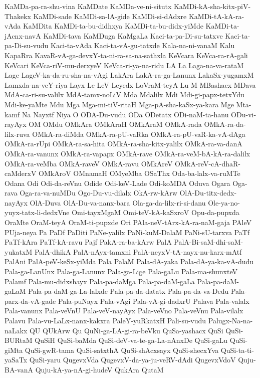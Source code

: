 {KaMDa-pa-ra-shu-vina
KaMDate
KaMDa-ve-ni-situtx
KaMDi-kA-sha-kitx-piV-Thakekx
KaMDi-sade
KaMDi-sa-lA-gide
KaMDi-si-dAdxre
KaMDi-tA-kA-ra-vAda
KaMDita
KaMDi-ta-bu-didhxya
KaMDi-ta-bu-didx-yiMde
KaMDi-ta-jAcnx-navA
KaMDi-tava
KaMDuga
KaMgaLa
Kaci-ta-pa-Di-su-tatxve
Kaci-ta-pa-Di-su-vudu
Kaci-ta-vAda
Kaci-ta-vA-gu-tatxde
Kala-na-ni-vanaM
Kalu
KapaRra
KavaR-vA-ga-devxY-ta-ni-ra-sa-na-sathxla
KeVcara
KeVca-ra-rA-gali
KeVcari
KeVca-riV-mu-derxyeV
KeVca-ri-ya-na-ridu
LA
La
Laga-na-va-rataM
Lage
LageV-ka-da-ru-sha-na-vAgi
LakAra
LakA-ra-ga-Lanunx
LakaSx-yugamxM
Lamxda-na-veY-riya
Layx
Le
LeV
Leyedx
LoVraM-teyA
Lu
M
MBashacx
MDava
MdA-ca-ri-su-valilx
MdA-tamx-noLiV
Mda
Mdalilx
Mdi
Mdi-gi-papx-tetxYdu
Mdi-ke-yaMte
Mdu
Mga
Mga-mi-tiV-ritaH
Mga-pA-sha-kaSx-ya-kara
Mge
Mta-kamf
Na
Nayxtf
Niya
O
ODA-Du-vudu
ODa
ODetatx
ODi-naM-ta-hanu
ODu-vi-rayAyx
OM
OMdu
OMkAra
OMkAraH
OMkAraM
OMkA-rada
OMkA-ra-da-lilx-ruva
OMkA-ra-diMda
OMkA-ra-pU-vaRka
OMkA-ra-pU-vaR-ka-vA-dAga
OMkA-ra-rUpi
OMkA-ra-sa-hita
OMkA-ra-sha-kitx-yalilx
OMkA-ra-va-danA
OMkA-ra-vanunx
OMkA-ra-vapapx
OMkA-rave
OMkA-ra-veM-bA-kA-ra-dalilx
OMkA-ra-veMba
OMkA-raveV
OMkA-ravu
OMkAreV
OMkA-reV-cA-dhaR-caMderxV
OMkAroV
OMnamaH
OMyeMba
OSaThx
Oda-ba-lalx-va-ruMTe
Odana
Odi
Odi-da-reVnu
Odide
Odi-keV-Lade
Odi-koMDA
Oduva
Ogara
Oga-rava
Oga-ra-va-nuMDu
Ogo-Du-vu-dilalx
OkA-rw-kArw
OlA-Du-titx-dedx-nayAyx
OlA-Duva
OlA-Du-va-nanx-bara
Ola-ga-da-lilx-ri-si-danu
Ole-ya-no-yuyx-tatx-li-dedxVne
Omi-tayxMgaM
Omi-teV-kA-kaSxroV
Opu-da-pupxda
OraMte
OraM-teyA
OraM-ti-pupxde
Ori
PAla-neV-tArx-kA-ra-naM-gaja
PAleV
PUja-neya
Pa
PaDf
PaDiti
PaNe-yalilx
PaNi-kuM-DalaM
PaNi-sU-tarxva
PaTf
PaTf-kAra
PaTf-kA-ravu
Pajf
PakA-ra-ba-kArw
PalA
PalA-Bi-saM-dhi-saM-yukatxM
PalA-dhikA
PalA-nAyx-tamxni
PalA-neyxV-tA-nayx-nu-karx-mAtf
PalAni
PalA-peV-keSx-yiMda
Pala
PalaM
Pala-dA-yaka
Pala-dA-ya-ka-vA-dudu
Pala-ga-LanUnx
Pala-ga-Lanunx
Pala-ga-Lige
Pala-gaLu
Pala-ma-shunxteV
Palamf
Pala-mu-didxshayx
Pala-pa-daMga
Pala-pa-daM-gaLa
Pala-pa-daM-gaLaM
Pala-pa-daM-ga-La-lalxde
Pala-pa-da-datatx
Pala-pa-da-va-Dedu
Pala-parx-da-vA-gade
Pala-puNayx
Pala-vAgi
Pala-vA-gi-dadxrU
Palava
Pala-valalx
Pala-vanunx
Pala-veVnU
Pala-veV-nayAyx
Pala-veVno
Pala-veVnu
Pala-vilalx
Palavu
Pala-vu-LaLx-nanx-kakxra
PaleY-yuRkatxH
Pali-su-vudu
Palugx-Na-na-naLakx
QU
QUkArw
Qu
QuNi-ga-LA-gi-ra-beVku
QuSa-yashacx
QuSi
QuSi-BURtaM
QuSiH
QuSi-baMda
QuSi-deV-va-te-ga-La-nAnxDe
QuSi-gaLu
QuSi-giMta
QuSi-gwR-tama
QuSi-satxthA
QuSi-shAcxsayx
QuSi-shecxYva
QuSi-ta-ti-yaSaTx
QuSi-yaru
QugevxVda
QugevxV-da-ya-ju-veRV-dAdi
QugevxVdoV
Quju-BA-vanA
Quju-kA-ya-nA-gi-hudeV
QukAra
QutaM
}
